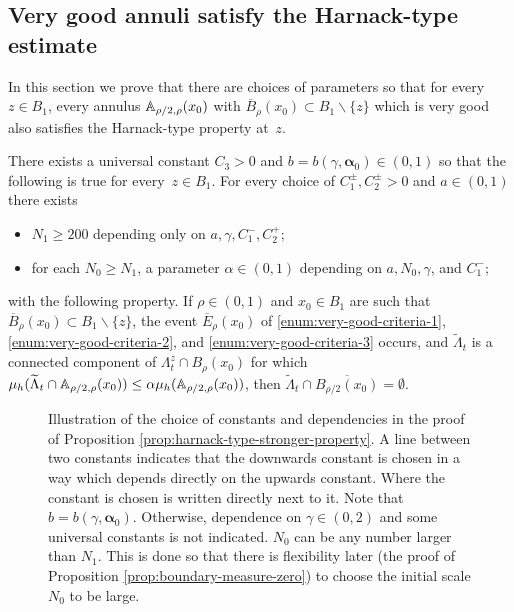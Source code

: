 \documentclass[12pt]{amsart}
\numberwithin{equation}{section}
\newcommand{\cluster}[2]{\hyperref[eq:non-co-set]{\mathit{\Lambda}^{#1}_{#2}}}
\begin{document}
	\subsection{Very good annuli satisfy the Harnack-type estimate} \label{subsec:very-good-annuli-satisfy-harnack-type-estimate}
	In this section we prove that there are choices of parameters so that for every~$z \in B_{1}$, every annulus $\mathbb{A}_{\rho/2, \rho}(x_0)$ with $\overline{B}_{\rho}(x_0) \subset B_1 \backslash \{z\}$  which is very good also satisfies the Harnack-type property at~$z$.
	\begin{lemma} \label{lemma:very-good-annuli-satisfy-harnack-type-estimate}
		There exists a universal constant $C_3 > 0$ and $b = b(\gamma,\boldsymbol{\alpha}_0) \in (0,1)$ so that the following is true %
		for every~$z \in B_{1}$.  For every choice of $C_1^\pm , C_2^\pm  > 0$ and $a \in (0,1)$ there exists 
		\begin{itemize}
			\item $N_1 \geq 200$ depending only on $a,\gamma,C_1^-, C_2^+$;
			\item for each $N_0 \geq N_1$, a parameter $\alpha \in (0,1)$ depending on $a, N_0, \gamma$, and $C^-_1$;
		\end{itemize}
		with the following property. If $\rho \in (0,1)$ and $x_0 \in B_1$ are such that $\overline{B}_{\rho}(x_0) \subset B_1 \backslash \{z\}$,  the event $\overline E_\rho(x_0)$ of \ref{enum:very-good-criteria-1},
		\ref{enum:very-good-criteria-2}, and \ref{enum:very-good-criteria-3} occurs, and $\widetilde\Lambda_t$ is a connected component of ${\cluster{z}{t}} \cap B_{\rho}(x_0)$ 
		for which  $\mu_h(\widetilde \Lambda_t \cap \mathbb{A}_{\rho/2, \rho}(x_0)) \leq \alpha \mu_h(\mathbb{A}_{\rho/2, \rho}(x_0))$, then $\widetilde\Lambda_t \cap \overline{B_{\rho/2}(x_0)} = \emptyset$.
	\end{lemma}
	
	
	\begin{figure}
		\begin{center}
			
		\end{center}
		\caption{Illustration of the choice of constants and dependencies in the proof of Proposition \ref{prop:harnack-type-stronger-property}.
			A line between two constants indicates
			that the downwards constant is chosen in a way which depends directly on the upwards constant. Where the constant is chosen is written directly next to it. Note that $b = b(\gamma,\boldsymbol{\alpha}_0)$. Otherwise, dependence on $\gamma \in (0,2)$ and some universal constants is not indicated.  
			$N_0$ can be any number larger than $N_1$. This is done so that there is flexibility later (the proof of Proposition \ref{prop:boundary-measure-zero}) to choose the initial scale $N_0$ to be large.} \label{fig:constant-dependencies}
	\end{figure}
	
\end{document}
